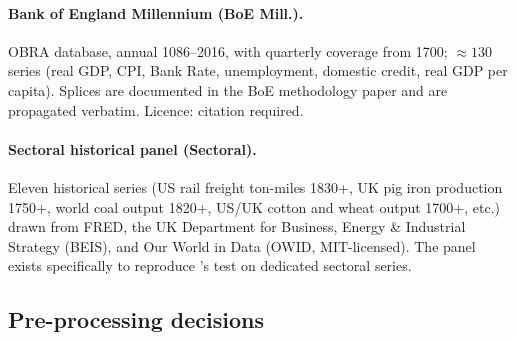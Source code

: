 \paragraph{Bank of England Millennium (BoE Mill.).}
\citet{boe_millennium} OBRA database, annual 1086--2016, with
quarterly coverage from 1700; \(\approx 130\) series (real GDP,
CPI, Bank Rate, unemployment, domestic credit, real GDP per
capita). Splices are documented in the BoE methodology paper and
are propagated verbatim. Licence: citation required.

\paragraph{Sectoral historical panel (Sectoral).}
Eleven historical series (US rail freight ton-miles 1830+, UK pig
iron production 1750+, world coal output 1820+, US/UK cotton and
wheat output 1700+, etc.) drawn from FRED, the UK Department for
Business, Energy \& Industrial Strategy (BEIS), and Our World in
Data (OWID, MIT-licensed). The panel exists specifically to
reproduce \citet{wen2005}'s test on dedicated sectoral series.

\subsection{Pre-processing decisions}

